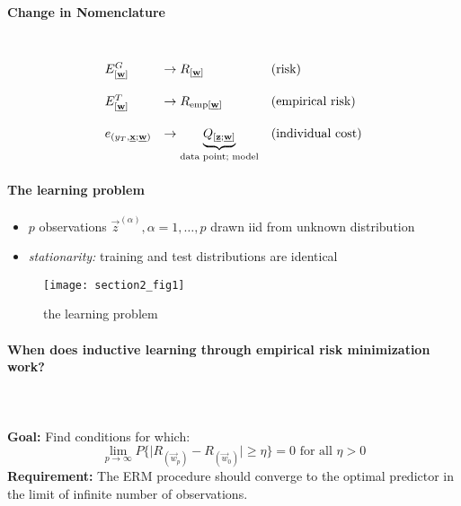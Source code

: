 \paragraph{Change in Nomenclature}\mbox{} \\
\[ \begin{array}{lll}
	E_{[\underline{\mathbf{w}}]}^G 
		& \rightarrow R_{[\underline{\mathbf{w}}]}
		& \text{(risk)} \\\\
	E_{[\underline{\mathbf{w}}]}^T 
		& \rightarrow R_{\operatorname{emp} [\underline{\mathbf{w}}]}
		& \text{(empirical risk)} \\\\
	e_{(y_T, \underline{\mathbf{x}}; \underline{\mathbf{w}})}
		& \rightarrow \underbrace{ Q_{[\underline{\mathbf{z}}; \underline{\mathbf{w}}]} }_{
				\text{data point; model}}
		& \text{(individual cost)}
\end{array} \]

\paragraph{The learning problem} 
\begin{itemize}
\item $p$ observations $\vec{z}^{(\alpha)}, \alpha = 1, \ldots, p$ drawn iid from  unknown distribution
\item \emph{stationarity:} training and test distributions are identical
\end{itemize}

\begin{figure}[h]
  \centering
\texttt{[image: section2\_fig1]} 
  \caption{the learning problem}
\end{figure}



\paragraph{When does inductive learning through empirical risk minimization work?} \mbox{}
\\\\
\textbf{Goal:} Find conditions for which:
\begin{equation}
	\lim_{p \rightarrow \infty} P \Big\{ \big| R_{(\vec{w}_p)}
		- R_{(\vec{w}_0)} \big| \geq \eta \Big\} = 0 
		\text{ for all } \eta > 0
\end{equation}
\textbf{Requirement:} The ERM procedure should converge to the optimal predictor in the limit of infinite number of observations. 

